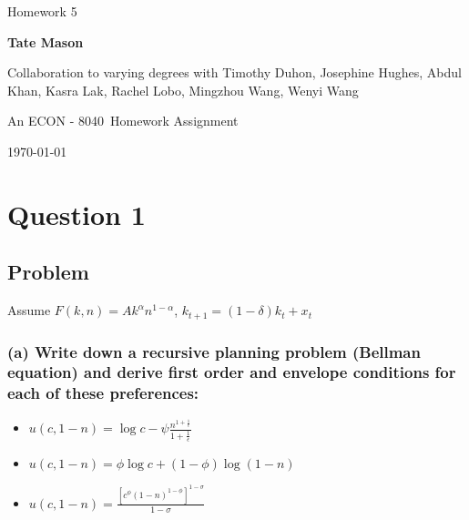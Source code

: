 \documentclass[10pt, a4paper]{article}
\newcommand\course{ECON - 8040}                            %
\newcommand\hwnumber{5}                                 %
\newcommand\Information{Tate Mason}                        %
\begin{document}
  \begin{titlepage}
    \begin{center}
      \vspace*{3cm}
            
        \vspace{1cm}
        \huge
        Homework \hwnumber
            
        \vspace{1.5cm}
        \Large
            
        \textbf{\Information}                      %
            
        \vfill
        

        Collaboration to varying degrees with Timothy Duhon, Josephine Hughes, Abdul Khan, Kasra Lak, Rachel Lobo, Mingzhou Wang, Wenyi Wang
        
        \vspace{1cm}

        An \course \ Homework Assignment
            
        \vspace{1cm}
        \Large

        
        \today
            
    \end{center}
  \end{titlepage}

  \newpage
\section*{Question 1}
  \subsection*{Problem}
    Assume $F(k,n) = Ak^{\alpha}n^{1-\alpha}$, $k_{t+1} = (1-\delta)k_t + x_t$
    \subsubsection*{(a) Write down a recursive planning problem (Bellman equation) and derive first order and envelope conditions for each of these preferences:}
    \begin{itemize}
      \item $u(c,1-n) = \log c - \psi \frac{n^{1+\frac{1}{\epsilon}}}{1+\frac{1}{\epsilon}}$
      \item $u(c,1-n) = \phi \log c + (1-\phi) \log(1-n)$
      \item $u(c,1-n) = \frac{[c^{\phi}(1-n)^{1-\phi}]^{1-\sigma}}{1-\sigma}$
    \end{itemize}
    
\end{document}
